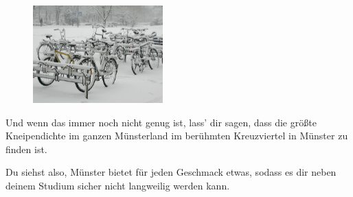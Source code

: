 \begin{multicols}{2}
\setlength{\columnsep}{2mm}
\begin{figure}
	\includegraphics[width=5cm]{res/muenster_fahrraeder_winter.png}
\end{figure}
Und wenn das immer noch nicht genug ist, lass' dir sagen, dass die größte Kneipendichte im ganzen Münsterland im berühmten Kreuzviertel in Münster zu finden ist.

Du siehst also, Münster bietet für jeden Geschmack etwas, sodass es dir neben deinem Studium sicher nicht langweilig werden kann.

\begin{center}
	\large{}
\end{center}

\end{multicols}
